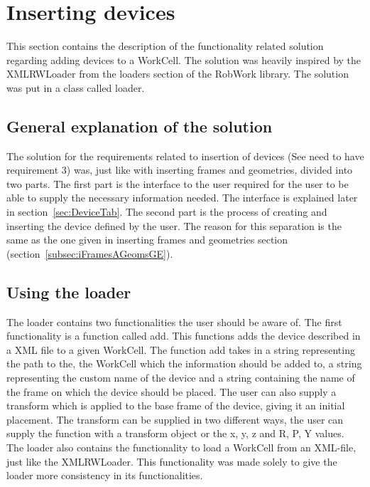\section{Inserting devices}
This section contains the description of the functionality related solution regarding adding devices to a WorkCell. The solution was heavily inspired by the XMLRWLoader from the loaders section of the RobWork library. The solution was put in a class called loader.

\subsection{General explanation of the solution}
The solution for the requirements related to insertion of devices (See need to have requirement 3) was, just like with inserting frames and geometries, divided into two parts. The first part is the interface to the user required for the user to be able to supply the necessary information needed. The interface is explained later in section~\ref{sec:DeviceTab}. The second part is the process of creating and inserting the device defined by the user. The reason for this separation is the same as the one given in inserting frames and geometries section (section~\ref{subsec:iFramesAGeomsGE}).

\subsection{Using the loader}
The loader contains two functionalities the user should be aware of. The first functionality is a function called add. This functions adds the device described in a XML file to a given WorkCell. The function add takes in a string representing the path to the, the WorkCell which the information should be added to, a string representing the custom name of the device and a string containing the name of the frame on which the device should be placed. The user can also supply a transform which is applied to the base frame of the device, giving it an initial placement. The transform can be supplied in two different ways, the user can supply the function with a transform object or the x, y, z and R, P, Y values.\\

The loader also contains the functionality to load a WorkCell from an XML-file, just like the XMLRWLoader. This functionality was made solely to give the loader more consistency in its functionalities.\\

